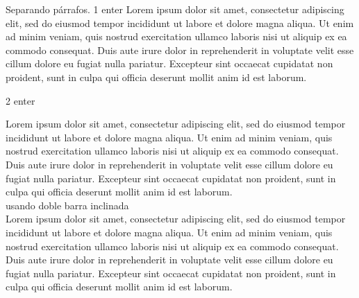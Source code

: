 \documentclass[a4paper,11pt]{article}
\begin{document}
Separando párrafos.
1 enter
Lorem ipsum dolor sit amet, consectetur adipiscing elit, sed do eiusmod tempor incididunt ut labore et dolore magna aliqua. Ut enim ad minim veniam, quis nostrud exercitation ullamco laboris nisi ut aliquip ex ea commodo consequat. Duis aute irure dolor in reprehenderit in voluptate velit esse cillum dolore eu fugiat nulla pariatur. Excepteur sint occaecat cupidatat non proident, sunt in culpa qui officia deserunt mollit anim id est laborum.

2 enter


Lorem ipsum dolor sit amet, consectetur adipiscing elit, sed do eiusmod tempor incididunt ut labore et dolore magna aliqua. Ut enim ad minim veniam, quis nostrud exercitation ullamco laboris nisi ut aliquip ex ea commodo consequat. Duis aute irure dolor in reprehenderit in voluptate velit esse cillum dolore eu fugiat nulla pariatur. Excepteur sint occaecat cupidatat non proident, sunt in culpa qui officia deserunt mollit anim id est laborum.
\\
usando doble barra inclinada
\\
Lorem ipsum dolor sit amet, consectetur adipiscing elit, sed do eiusmod tempor incididunt ut labore et dolore magna aliqua. Ut enim ad minim veniam, quis nostrud exercitation ullamco laboris nisi ut aliquip ex ea commodo consequat. Duis aute irure dolor in reprehenderit in voluptate velit esse cillum dolore eu fugiat nulla pariatur. Excepteur sint occaecat cupidatat non proident, sunt in culpa qui officia deserunt mollit anim id est laborum.
\end{document}
